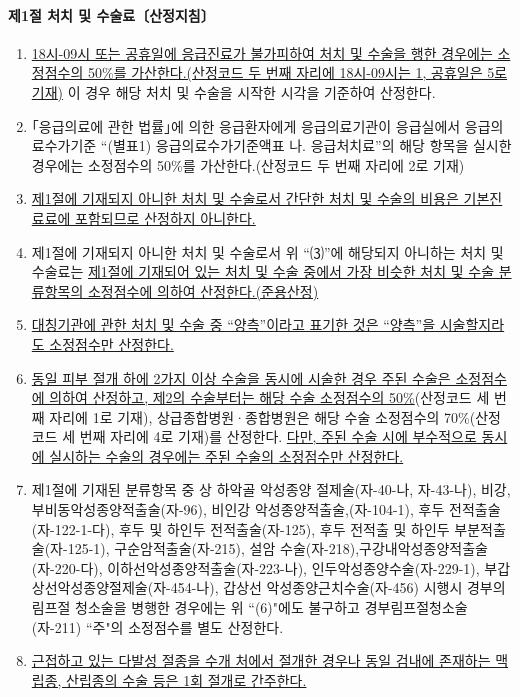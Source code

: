 \paragraph{제1절 처치 및 수술료〔산정지침〕}
\begin{enumerate}[(1)]\tightlist
\item \uline{18시-09시 또는 공휴일에 응급진료가 불가피하여 처치 및 수술을 행한 경우에는 소정점수의 50\%를 가산한다.(산정코드 두 번째 자리에 18시-09시는 1, 공휴일은 5로 기재)} 이 경우 해당 처치 및 수술을 시작한 시각을 기준하여 산정한다.
\item ｢응급의료에 관한 법률｣에 의한 응급환자에게 응급의료기관이 응급실에서 응급의료수가기준 “(별표1) 응급의료수가기준액표 나. 응급처치료”의 해당 항목을 실시한 경우에는 소정점수의 50\%를 가산한다.(산정코드 두 번째 자리에 2로 기재)
\item \uline{제1절에 기재되지 아니한 처치 및 수술로서 간단한 처치 및 수술의 비용은 기본진료료에 포함되므로 산정하지 아니한다.}
\item 제1절에 기재되지 아니한 처치 및 수술로서 위 “⑶”에 해당되지 아니하는 처치 및 수술료는 \uline{제1절에 기재되어 있는 처치 및 수술 중에서 가장 비슷한 처치 및 수술 분류항목의 소정점수에 의하여 산정한다.(준용산정)}
\item \uline{대칭기관에 관한 처치 및 수술 중 “양측”이라고 표기한 것은 “양측”을 시술할지라도 소정점수만 산정한다.}
\item \uline{동일 피부 절개 하에 2가지 이상 수술을 동시에 시술한 경우 주된 수술은 소정점수에 의하여 산정하고, 제2의 수술부터는 해당 수술 소정점수의 50\%}(산정코드 세 번째 자리에 1로 기재), 상급종합병원·종합병원은 해당 수술 소정점수의 70\%(산정코드 세 번째 자리에 4로 기재)를 산정한다. \uline{다만, 주된 수술 시에 부수적으로 동시에 실시하는 수술의 경우에는 주된 수술의 소정점수만 산정한다.}
\item 제1절에 기재된 분류항목 중 상\cntrdot{} 하악골 악성종양 절제술(자-40-나,
자-43-나), 비강, 부비동악성종양적출술(자-96), 비인강 악성종양적출술,(자-104-1), 후두 전적출술(자-122-1-다), 후두 및 하인두 전적출술(자-125), 후두 전적출 및 하인두 부분적출술(자-125-1), 구순암적출술(자-215), 설암 수술(자-218),구강내악성종양적출술(자-220-다), 이하선악성종양적출술(자-223-나), 인두악성종양수술(자-229-1), 부갑상선악성종양절제술(자-454-나), 갑상선 악성종양근치수술(자-456) 시행시 경부의 림프절 청소술을 병행한 경우에는 위 “(6)"에도 불구하고 경부림프절청소술(자-211) “주"의 소정점수를 별도 산정한다.
\item \uline{근접하고 있는 다발성 절종을 수개 처에서 절개한 경우나 동일 검내에 존재하는 맥립종, 산립종의 수술 등은 1회 절개로 간주한다.}

\end{enumerate}
